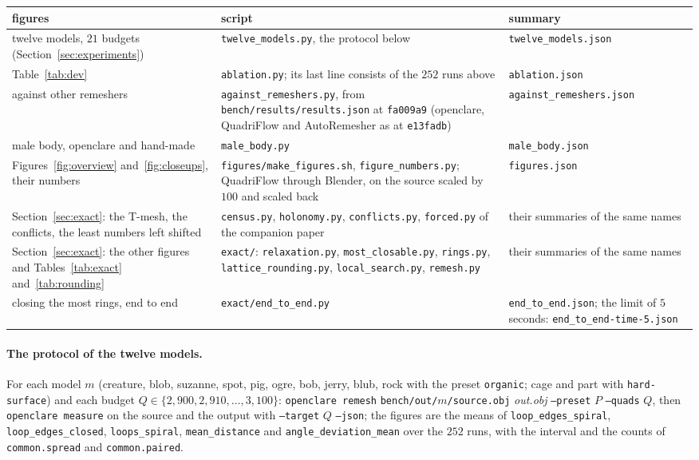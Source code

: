 \documentclass[11pt,a4paper]{article}
\begin{document}
\begin{center}
\small
\setlength{\tabcolsep}{4pt}
\begin{tabular}{@{}>{\raggedright\arraybackslash}p{5.6cm}>{\raggedright\arraybackslash}p{4.6cm}>{\raggedright\arraybackslash}p{4.4cm}@{}}
\toprule
figures & script & summary \\
\midrule
twelve models, $21$ budgets (Section~\ref{sec:experiments})
  & \texttt{twelve\_models.py}, the protocol below
  & \texttt{twelve\_models.json} \\
Table~\ref{tab:dev}
  & \texttt{ablation.py}; its last line consists of the $252$ runs above
  & \texttt{ablation.json} \\
against other remeshers
  & \texttt{against\_remeshers.py}, from \nolinkurl{bench/results/results.json}
  at \texttt{fa009a9} (openclare, QuadriFlow and AutoRemesher as at
  \texttt{e13fadb})
  & \texttt{against\_remeshers.json} \\
male body, openclare and hand-made
  & \texttt{male\_body.py}
  & \texttt{male\_body.json} \\
Figures~\ref{fig:overview} and~\ref{fig:closeups}, their numbers
  & \texttt{figures/make\_figures.sh}, \texttt{figure\_numbers.py};
  QuadriFlow through Blender, on the source scaled by $100$ and scaled back
  & \texttt{figures.json} \\
Section~\ref{sec:exact}: the T-mesh, the conflicts, the least numbers left
shifted
  & \texttt{census.py}, \texttt{holonomy.py}, \texttt{conflicts.py},
  \texttt{forced.py} of the companion paper
  & their summaries of the same names \\
Section~\ref{sec:exact}: the other figures and Tables~\ref{tab:exact}
and~\ref{tab:rounding}
  & \texttt{exact/}: \texttt{relaxation.py}, \texttt{most\_closable.py},
  \texttt{rings.py}, \texttt{lattice\_rounding.py}, \texttt{local\_search.py},
  \texttt{remesh.py}
  & their summaries of the same names \\
closing the most rings, end to end
  & \texttt{exact/end\_to\_end.py}
  & \texttt{end\_to\_end.json}; the limit of $5$ seconds:
  \texttt{end\_to\_end-time-5.json} \\
\bottomrule
\end{tabular}
\end{center}

\paragraph{The protocol of the twelve models.} For each model $m$ (creature,
blob, suzanne, spot, pig, ogre, bob, jerry, blub, rock with the preset
\texttt{organic}; cage and part with \texttt{hard-surface}) and each budget
$Q \in \{2{,}900, 2{,}910, \dots, 3{,}100\}$: \texttt{openclare remesh}
\texttt{bench/out/}$m$\texttt{/source.obj} \textit{out.obj}
\texttt{--preset} $P$ \texttt{--quads} $Q$, then \texttt{openclare measure}
on the source and the output with \texttt{--target} $Q$ \texttt{--json}; the
figures are the means of \texttt{loop\_edges\_spiral},
\texttt{loop\_edges\_closed}, \texttt{loops\_spiral},
\texttt{mean\_distance} and \texttt{angle\_deviation\_mean} over the $252$
runs, with the interval and the counts of \texttt{common.spread} and
\texttt{common.paired}.
\end{document}

